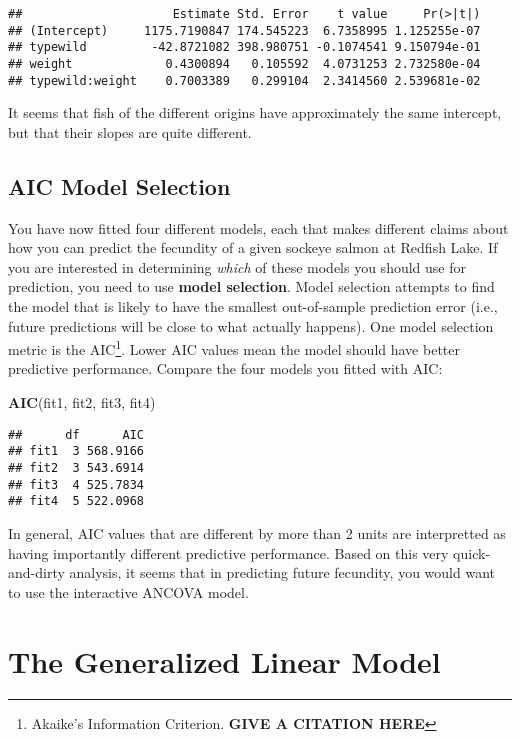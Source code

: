\documentclass[]{book}
\newenvironment{Shaded}{\begin{snugshade}}{\end{snugshade}}
\newcommand{\KeywordTok}[1]{\textcolor[rgb]{0.13,0.29,0.53}{\textbf{#1}}}
\newcommand{\NormalTok}[1]{#1}
\let\rmarkdownfootnote\footnote%
\def\footnote{\protect\rmarkdownfootnote}
\theoremstyle{definition}
\theoremstyle{definition}
\theoremstyle{definition}
\theoremstyle{remark}
\begin{document}
\begin{verbatim}
##                     Estimate Std. Error    t value     Pr(>|t|)
## (Intercept)     1175.7190847 174.545223  6.7358995 1.125255e-07
## typewild         -42.8721082 398.980751 -0.1074541 9.150794e-01
## weight             0.4300894   0.105592  4.0731253 2.732580e-04
## typewild:weight    0.7003389   0.299104  2.3414560 2.539681e-02
\end{verbatim}

It seems that fish of the different origins have approximately the same
intercept, but that their slopes are quite different.

\subsection{AIC Model Selection}\label{aic-model-selection}

You have now fitted four different models, each that makes different
claims about how you can predict the fecundity of a given sockeye salmon
at Redfish Lake. If you are interested in determining \emph{which} of
these models you should use for prediction, you need to use
\textbf{model selection}. Model selection attempts to find the model
that is likely to have the smallest out-of-sample prediction error
(i.e., future predictions will be close to what actually happens). One
model selection metric is the AIC\footnote{Akaike's Information
  Criterion. \textbf{GIVE A CITATION HERE}}. Lower AIC values mean the
model should have better predictive performance. Compare the four models
you fitted with AIC:

\begin{Shaded}
\begin{Highlighting}[]
\KeywordTok{AIC}\NormalTok{(fit1, fit2, fit3, fit4)}
\end{Highlighting}
\end{Shaded}

\begin{verbatim}
##      df      AIC
## fit1  3 568.9166
## fit2  3 543.6914
## fit3  4 525.7834
## fit4  5 522.0968
\end{verbatim}

In general, AIC values that are different by more than 2 units are
interpretted as having importantly different predictive performance.
Based on this very quick-and-dirty analysis, it seems that in predicting
future fecundity, you would want to use the interactive ANCOVA model.

\section{The Generalized Linear Model}\label{glms}
\end{document}
